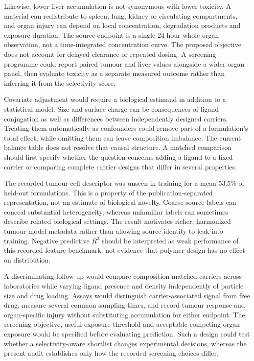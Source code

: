\documentclass[11pt]{article}
\begin{document}
Likewise, lower liver accumulation is not synonymous with lower toxicity. A material can redistribute to spleen, lung, kidney or circulating compartments, and organ injury can depend on local concentration, degradation products and exposure duration. The source endpoint is a single 24-hour whole-organ observation, not a time-integrated concentration curve. The proposed objective does not account for delayed clearance or repeated dosing. A screening programme could report paired tumour and liver values alongside a wider organ panel, then evaluate toxicity as a separate measured outcome rather than inferring it from the selectivity score.

Covariate adjustment would require a biological estimand in addition to a statistical model. Size and surface charge can be consequences of ligand conjugation as well as differences between independently designed carriers. Treating them automatically as confounders could remove part of a formulation's total effect, while omitting them can leave composition imbalance. The current balance table does not resolve that causal structure. A matched comparison should first specify whether the question concerns adding a ligand to a fixed carrier or comparing complete carrier designs that differ in several properties.

The recorded tumour-cell descriptor was unseen in training for a mean 53.5\% of held-out formulations. This is a property of the publication-separated representation, not an estimate of biological novelty. Coarse source labels can conceal substantial heterogeneity, whereas unfamiliar labels can sometimes describe related biological settings. The result motivates richer, harmonized tumour-model metadata rather than allowing source identity to leak into training. Negative predictive \(R^2\) should be interpreted as weak performance of this recorded-feature benchmark, not evidence that polymer design has no effect on distribution.

A discriminating follow-up would compare composition-matched carriers across laboratories while varying ligand presence and density independently of particle size and drug loading. Assays would distinguish carrier-associated signal from free drug, measure several common sampling times, and record tumour response and organ-specific injury without substituting accumulation for either endpoint. The screening objective, useful exposure threshold and acceptable competing-organ exposure would be specified before evaluating prediction. Such a design could test whether a selectivity-aware shortlist changes experimental decisions, whereas the present audit establishes only how the recorded screening choices differ.
\end{document}
